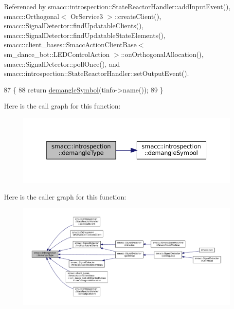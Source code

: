 Referenced by smacc\+::introspection\+::\+State\+Reactor\+Handler\+::add\+Input\+Event(), smacc\+::\+Orthogonal$<$ Or\+Service3 $>$\+::create\+Client(), smacc\+::\+Signal\+Detector\+::find\+Updatable\+Clients(), smacc\+::\+Signal\+Detector\+::find\+Updatable\+State\+Elements(), smacc\+::client\+\_\+bases\+::\+Smacc\+Action\+Client\+Base$<$ sm\+\_\+dance\+\_\+bot\+::\+L\+E\+D\+Control\+Action $>$\+::on\+Orthogonal\+Allocation(), smacc\+::\+Signal\+Detector\+::poll\+Once(), and smacc\+::introspection\+::\+State\+Reactor\+Handler\+::set\+Output\+Event().


\begin{DoxyCode}
87 \{
88     \textcolor{keywordflow}{return} \hyperlink{namespacesmacc_1_1introspection_aa9158a0ff0cfe83a59877e6af7d7f873}{demangleSymbol}(tinfo->name());
89 \}
\end{DoxyCode}
Here is the call graph for this function\+:
\nopagebreak
\begin{figure}[H]
\begin{center}
\leavevmode
\includegraphics[width=350pt]{namespacesmacc_1_1introspection_a670e39ccea29952859df4e2d0e45077b_cgraph}
\end{center}
\end{figure}
Here is the caller graph for this function\+:
\nopagebreak
\begin{figure}[H]
\begin{center}
\leavevmode
\includegraphics[width=350pt]{namespacesmacc_1_1introspection_a670e39ccea29952859df4e2d0e45077b_icgraph}
\end{center}
\end{figure}
\mbox{\label{namespacesmacc_1_1introspection_a81ad2fc77a0262640d4b1bd273938603}} 
